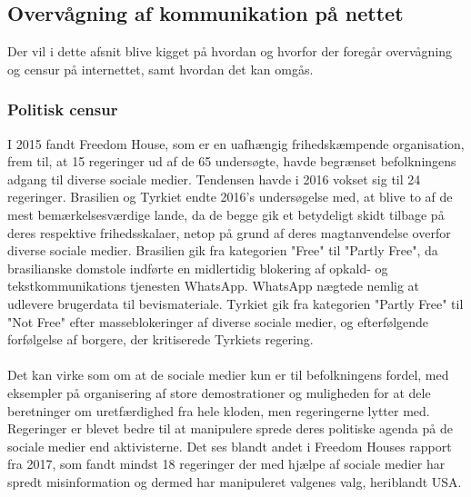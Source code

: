 \subsection{Overvågning af kommunikation på nettet}
Der vil i dette afsnit blive kigget på hvordan og hvorfor der foregår overvågning og censur på internettet, samt hvordan det kan omgås.

\subsubsection{Politisk censur}
I 2015 fandt Freedom House, som er en uafhængig frihedskæmpende organisation, frem til, at 15 regeringer ud af de 65 undersøgte, havde begrænset befolkningens adgang til diverse sociale medier.\cite{FreedomHouseRapport2016} Tendensen havde i 2016 vokset sig til 24 regeringer.\cite{FreedomHouseRapport2016} Brasilien og Tyrkiet endte 2016's undersøgelse med, at blive to af de mest bemærkelsesværdige lande, da de begge gik et betydeligt skidt tilbage på deres respektive frihedsskalaer, netop på grund af deres magtanvendelse overfor diverse sociale medier. Brasilien gik fra kategorien "Free" til "Partly Free", da brasilianske domstole indførte en midlertidig blokering af opkald- og tekstkommunikations tjenesten WhatsApp. WhatsApp nægtede nemlig at udlevere brugerdata til bevismateriale. Tyrkiet gik fra kategorien "Partly Free" til "Not Free" efter masseblokeringer af diverse sociale medier, og efterfølgende forfølgelse af borgere, der kritiserede Tyrkiets regering.\cite{FreedomHouseRapport2016}
\\\\
Det kan virke som om at de sociale medier kun er til befolkningens fordel, med eksempler på organisering af store demostrationer og muligheden for at dele beretninger om uretfærdighed fra hele kloden, men regeringerne lytter med. Regeringer er blevet bedre til at manipulere sprede deres politiske agenda på de sociale medier end aktivisterne.\cite{SocialHelpDictators} Det ses blandt andet i Freedom Houses rapport fra 2017, som fandt mindst 18 regeringer der med hjælpe af sociale medier har spredt misinformation og dermed har manipuleret valgenes valg, heriblandt USA.\cite{FreedomHouseRapport2017}



